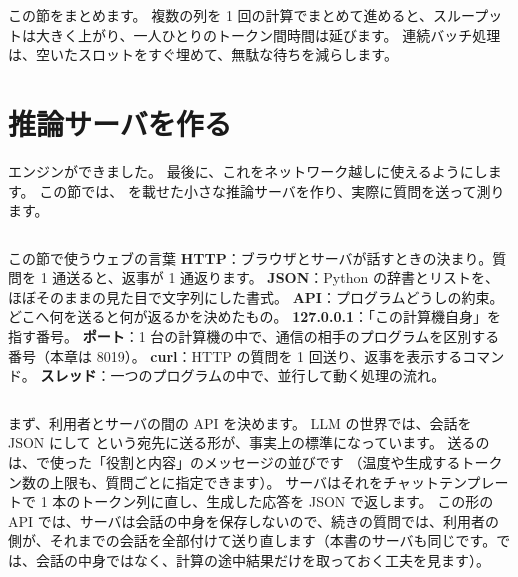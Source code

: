 この節をまとめます。
複数の列を 1 回の計算でまとめて進めると、スループットは大きく上がり、一人ひとりのトークン間時間は延びます。
連続バッチ処理は、空いたスロットをすぐ埋めて、無駄な待ちを減らします。

\section{推論サーバを作る}\label{sec:es-server}

エンジンができました。
最後に、これをネットワーク越しに使えるようにします。
この節では、 を載せた小さな推論サーバを作り、実際に質問を送って測ります。

\begin{column}{この節で使うウェブの言葉}
\textbf{HTTP}：ブラウザとサーバが話すときの決まり。質問を 1 通送ると、返事が 1 通返ります。
\textbf{JSON}：Python の辞書とリストを、ほぼそのままの見た目で文字列にした書式。
\textbf{API}：プログラムどうしの約束。どこへ何を送ると何が返るかを決めたもの。
\textbf{127.0.0.1}：「この計算機自身」を指す番号。
\textbf{ポート}：1 台の計算機の中で、通信の相手のプログラムを区別する番号（本章は 8019）。
\textbf{curl}：HTTP の質問を 1 回送り、返事を表示するコマンド。
\textbf{スレッド}：一つのプログラムの中で、並行して動く処理の流れ。
\end{column}

まず、利用者とサーバの間の API を決めます。
LLM の世界では、会話を JSON にして  という宛先に送る形が、事実上の標準になっています。
送るのは、で使った「役割と内容」のメッセージの並びです
（温度や生成するトークン数の上限も、質問ごとに指定できます）。
サーバはそれをチャットテンプレートで 1 本のトークン列に直し、生成した応答を JSON で返します。
この形の API では、サーバは会話の中身を保存しないので、続きの質問では、利用者の側が、それまでの会話を全部付けて送り直します（本書のサーバも同じです。では、会話の中身ではなく、計算の途中結果だけを取っておく工夫を見ます）。

